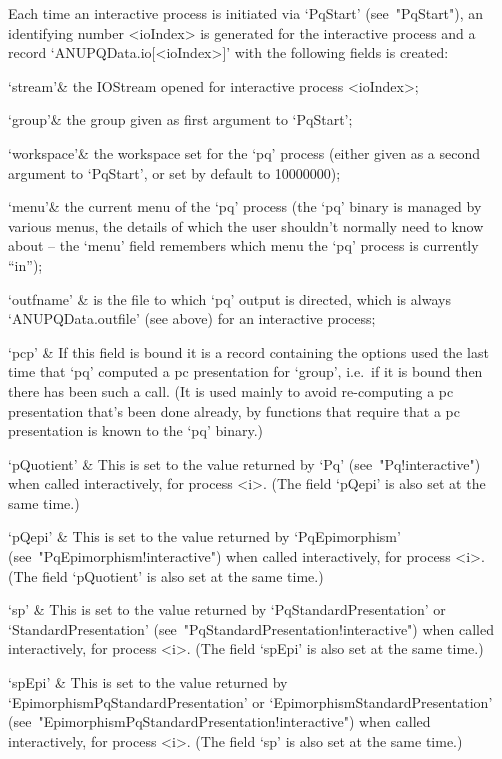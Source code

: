 Each time an interactive {\ANUPQ}  process  is  initiated  via  `PqStart'
(see~"PqStart"), an identifying number <ioIndex>  is  generated  for  the
interactive process  and  a  record  `ANUPQData.io[<ioIndex>]'  with  the
following fields is created:

\beginitems

\quad`stream'& the  IOStream  opened  for  interactive  {\ANUPQ}  process
<ioIndex>;

\quad`group'& the group given as first argument to `PqStart';

\quad`workspace'& the workspace set for the `pq' process (either given as
a second argument to `PqStart', or set by default to 10000000);

\quad`menu'& the current menu of the `pq' process  (the  `pq'  binary  is
managed by various  menus,  the  details  of  which  the  user  shouldn't
normally need to know about -- the `menu' field remembers which menu  the
`pq' process is currently ``in'');

\quad`outfname' & is the file to which `pq' output is directed, which  is
always `ANUPQData.outfile' (see above) for an interactive process;

\quad`pcp' & If this field is bound it is a record containing the options
used the last time that `pq' computed  a  pc  presentation  for  `group',
i.e.~if it is bound then there has been such a call. (It is  used  mainly
to avoid re-computing a pc presentation  that's  been  done  already,  by
functions that require that a  pc  presentation  is  known  to  the  `pq'
binary.)

\quad`pQuotient'  &  This  is  set  to  the  value   returned   by   `Pq'
(see~"Pq!interactive") when called interactively, for process  <i>.  (The
field `pQepi' is also set at the same time.)

\quad`pQepi' & This is set  to  the  value  returned  by  `PqEpimorphism'
(see~"PqEpimorphism!interactive") when called interactively, for  process
<i>. (The field `pQuotient' is also set at the same time.)

\quad`sp' & This is set to the value returned by `PqStandardPresentation'
or `StandardPresentation' (see~"PqStandardPresentation!interactive") when
called interactively, for process <i>. (The field `spEpi' is also set  at
the same time.)

\quad`spEpi'   &   This   is   set   to    the    value    returned    by
`EpimorphismPqStandardPresentation' or  `EpimorphismStandardPresentation'
(see~"EpimorphismPqStandardPresentation!interactive")     when     called
interactively, for process <i>. (The field `sp' is also set at  the  same
time.)

